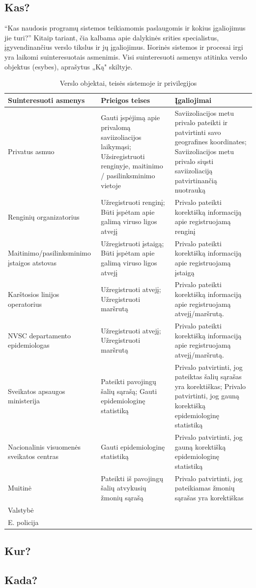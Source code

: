 \documentclass{VUMIFPSkursinis}
\begin{document}
\subsection{Kas?}
 “Kas naudosis programų sistemos
teikiamomis paslaugomis ir kokius įgaliojimus jie turi?” Kitaip tariant, čia kalbama apie
dalykinės srities specialistus, įgyvendinančius verslo tikslus ir jų įgaliojimus. Išorinės sistemos ir procesai irgi yra laikomi suinteresuotais asmenimis. Visi suinteresuoti asmenys atitinka verslo objektus (esybes), aprašytus „Ką" skiltyje.
\begin{center}
	\small
	\begin{longtable}{|L{3cm}|C{5cm}|C{7cm}|}
		\caption{Verslo objektai, teisės sistemoje ir privilegijos}
		\label{table:EmployeeSalary}
		\\ \hline
		Suinteresuoti asmenys &
		Prieigos teises   &										
		Įgaliojimai \\ \hline
		Privatus asmuo &
		Gauti įspėjimą apie privalomą saviizoliacijos laikymąsi; Užsiregistruoti renginyje, maitinimo / pasilinksminimo vietoje&
		Saviizoliacijos metu privalo pateikti ir patvirtinti savo geografines koordinates; Saviizoliacijos metu privalo siųsti saviizoliaciją patvirtinančią nuotrauką\\ \hline
		Renginių organizatorius &
		Užregistruoti renginį; Būti įspėtam apie galimą viruso ligos atvejį&
		Privalo pateikti korektišką informaciją apie registruojamą renginį\\ \hline		
		Maitinimo/pasilinksminimo įstaigos atstovas &
		Užregistruoti įstaigą; Būti įspėtam apie galimą viruso ligos atvejį&
		Privalo pateikti korektišką informaciją apie registruojamą įstaigą\\ \hline	
		Karštosios linijos operatorius &
		Užregistruoti atvejį; Užregistruoti maršrutą&
		Privalo pateikti korektišką informaciją apie registruojamą atvejį/maršrutą.\\ \hline	
		NVSC departamento epidemiologas &
		Užregistruoti atvejį; Užregistruoti maršrutą&
		Privalo pateikti korektišką informaciją apie registruojamą atvejį/maršrutą.\\ \hline	
		Sveikatos apsaugos ministerija &
		Pateikti pavojingų šalių sąrašą; Gauti epidemiologinę statistiką&
		Privalo patvirtinti, jog pateiktas šalių sąrašas yra korektiškas; Privalo patvirtinti, jog gauną korektišką epidemiologinę statistiką\\ \hline	
		Nacionalinis visuomenės sveikatos centras &
		Gauti epidemiologinę statistiką&
		Privalo patvirtinti, jog gauną korektišką epidemiologinę statistiką\\ \hline	
		Muitinė &
		Pateikti iš pavojingų šalių atvykusių žmonių sąrašą&
		Privalo patvirtinti, jog pateikiamas žmonių sąrašas yra korektiškas\\ \hline	
		Valstybė &
		&
		\\ \hline	
		E. policija &
		&
		\\ \hline																	
\end{longtable}
\end{center}

\subsection{Kur?}

\subsection{Kada?}
\end{document}
